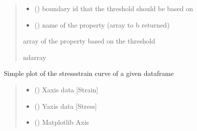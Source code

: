 \documentclass[letterpaper,10pt,english]{sphinxmanual}
\begin{document}
\begin{fulllineitems}
\begin{fulllineitems}
\begin{quote}
\begin{description}
\begin{itemize}
\item {} 
\sphinxAtStartPar
{} () \textendash{} boundary id that the threshold should be based on

\item {} 
\sphinxAtStartPar
{} () \textendash{} name of the property (array to b returned)

\end{itemize}

\sphinxAtStartPar
array of the property based on the threshold

\sphinxAtStartPar
ndarray

\end{description}\end{quote}

\end{fulllineitems}


\begin{fulllineitems}
\label{\detokenize{openfdem:openfdem.openfdem.Model.plot_stress_strain}}
\pysigstartsignatures
{}
\pysigstopsignatures
\sphinxAtStartPar
Simple plot of the stress\sphinxhyphen{}strain curve of a given dataframe
\begin{quote}\begin{description}
\begin{itemize}
\item {} 
\sphinxAtStartPar
{} () \textendash{} X\sphinxhyphen{}axis data {[}Strain{]}

\item {} 
\sphinxAtStartPar
{} () \textendash{} Y\sphinxhyphen{}axis data {[}Stress{]}

\item {} 
\sphinxAtStartPar
{} () \textendash{} Matplotlib Axis


\end{itemize}
\end{description}
\end{quote}
\end{fulllineitems}
\end{fulllineitems}
\end{document}
